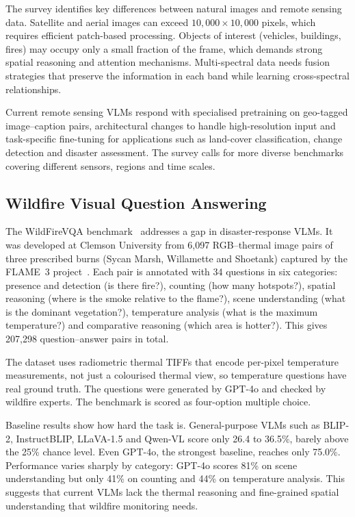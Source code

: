 \documentclass[12pt]{report}
\begin{document}
The survey identifies key differences between natural images and remote sensing data. Satellite and aerial images can exceed $10{,}000\times10{,}000$ pixels, which requires efficient patch-based processing. Objects of interest (vehicles, buildings, fires) may occupy only a small fraction of the frame, which demands strong spatial reasoning and attention mechanisms. Multi-spectral data needs fusion strategies that preserve the information in each band while learning cross-spectral relationships.

Current remote sensing VLMs respond with specialised pretraining on geo-tagged image--caption pairs, architectural changes to handle high-resolution input and task-specific fine-tuning for applications such as land-cover classification, change detection and disaster assessment. The survey calls for more diverse benchmarks covering different sensors, regions and time scales.

\subsection{Wildfire Visual Question Answering}
The WildFireVQA benchmark~\cite{wildfirevqa} addresses a gap in disaster-response VLMs. It was developed at Clemson University from 6{,}097 RGB--thermal image pairs of three prescribed burns (Sycan Marsh, Willamette and Shoetank) captured by the FLAME~3 project~\cite{flame3}. Each pair is annotated with 34 questions in six categories: presence and detection (is there fire?), counting (how many hotspots?), spatial reasoning (where is the smoke relative to the flame?), scene understanding (what is the dominant vegetation?), temperature analysis (what is the maximum temperature?) and comparative reasoning (which area is hotter?). This gives 207{,}298 question--answer pairs in total.

The dataset uses radiometric thermal TIFFs that encode per-pixel temperature measurements, not just a colourised thermal view, so temperature questions have real ground truth. The questions were generated by GPT-4o and checked by wildfire experts. The benchmark is scored as four-option multiple choice.

Baseline results show how hard the task is. General-purpose VLMs such as BLIP-2, InstructBLIP, LLaVA-1.5 and Qwen-VL score only 26.4 to 36.5\%, barely above the 25\% chance level. Even GPT-4o, the strongest baseline, reaches only 75.0\%. Performance varies sharply by category: GPT-4o scores 81\% on scene understanding but only 41\% on counting and 44\% on temperature analysis. This suggests that current VLMs lack the thermal reasoning and fine-grained spatial understanding that wildfire monitoring needs.
\end{document}
